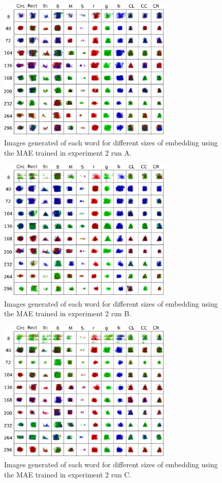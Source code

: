 \begin{figure}
\centering
\includegraphics[width=0.75\textwidth]{Figs/shapes/singlelabel333A.png}
\caption{Images generated of each word for different sizes of embedding using the MAE trained in experiment 2 run A.}
\label{fig:333singleA}
\end{figure}
\begin{figure}
\centering
\includegraphics[width=0.75\textwidth]{Figs/shapes/singlelabel333B.png}
\caption{Images generated of each word for different sizes of embedding using the MAE trained in experiment 2 run B.}
\label{fig:333singleB}
\end{figure}
\begin{figure}
\centering
\includegraphics[width=0.75\textwidth]{Figs/shapes/singlelabel333C.png}
\caption{Images generated of each word for different sizes of embedding using the MAE trained in experiment 2 run C.}
\label{fig:333singleC}
\end{figure}
